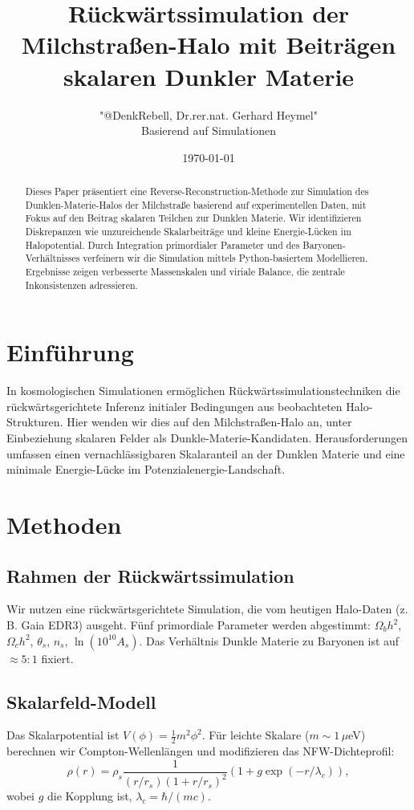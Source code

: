 \documentclass{article}
\title{Rückwärtssimulation der Milchstraßen-Halo mit Beiträgen skalaren Dunkler Materie}
\author{"@DenkRebell, Dr.rer.nat. Gerhard Heymel" \\ Basierend auf Simulationen}
\date{\today}
\begin{document}
	
	\maketitle
	
	\begin{abstract}
		Dieses Paper präsentiert eine Reverse-Reconstruction-Methode zur Simulation des Dunklen-Materie-Halos der Milchstraße basierend auf experimentellen Daten, mit Fokus auf den Beitrag skalaren Teilchen zur Dunklen Materie. Wir identifizieren Diskrepanzen wie unzureichende Skalarbeiträge und kleine Energie-Lücken im Halopotential. Durch Integration primordialer Parameter und des Baryonen-Verhältnisses verfeinern wir die Simulation mittels Python-basiertem Modellieren. Ergebnisse zeigen verbesserte Massenskalen und viriale Balance, die zentrale Inkonsistenzen adressieren.
	\end{abstract}
	
	\section{Einführung}
	In kosmologischen Simulationen ermöglichen Rückwärtssimulationstechniken die rückwärtsgerichtete Inferenz initialer Bedingungen aus beobachteten Halo-Strukturen. Hier wenden wir dies auf den Milchstraßen-Halo an, unter Einbeziehung skalaren Felder als Dunkle-Materie-Kandidaten. Herausforderungen umfassen einen vernachlässigbaren Skalaranteil an der Dunklen Materie und eine minimale Energie-Lücke im Potenzialenergie-Landschaft.
	
	\section{Methoden}
	\subsection{Rahmen der Rückwärtssimulation}
	Wir nutzen eine rückwärtsgerichtete Simulation, die vom heutigen Halo-Daten (z.\,B. Gaia EDR3) ausgeht. Fünf primordiale Parameter werden abgestimmt: $\Omega_b h^2$, $\Omega_c h^2$, $\theta_s$, $n_s$, $\ln(10^{10} A_s)$. Das Verhältnis Dunkle Materie zu Baryonen ist auf $\approx 5:1$ fixiert.
	
	\subsection{Skalarfeld-Modell}
	Das Skalarpotential ist $V(\phi) = \frac{1}{2} m^2 \phi^2$. Für leichte Skalare ($m \sim 1\,\mu$eV) berechnen wir Compton-Wellenlängen und modifizieren das NFW-Dichteprofil:
	\[
	\rho(r) = \rho_s \frac{1}{(r/r_s)(1 + r/r_s)^2} \left(1 + g \exp(-r / \lambda_c)\right),
	\]
	wobei $g$ die Kopplung ist, $\lambda_c = \hbar / (m c)$.
	
\end{document}

